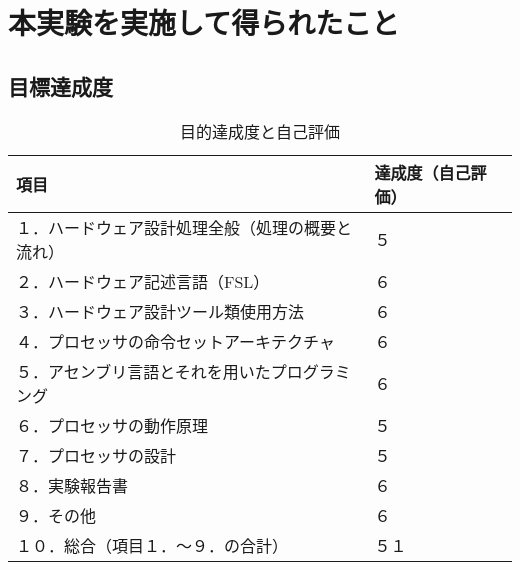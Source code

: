 \documentclass{jarticle}[11pt]
\begin{document}
  \section{本実験を実施して得られたこと}\label{sec:本実験を実施して得られたこと}

  \subsection{目標達成度}

    \begin{table*}[h]
      \caption{目的達成度と自己評価}
      \label{目的達成度と自己評価}
      \begin{center}
        \begin{tabular}{l|l}
          \hline \hline
          項目 &
          達成度（自己評価）
          \\ \hline

          １．ハードウェア設計処理全般（処理の概要と流れ）&
          ５
          \\ 
  
          ２．ハードウェア記述言語（FSL）&
          ６
          \\
          
          ３．ハードウェア設計ツール類使用方法&
          ６
          \\

          ４．プロセッサの命令セットアーキテクチャ&
          ６
          \\

          ５．アセンブリ言語とそれを用いたプログラミング&
          ６
          \\

          ６．プロセッサの動作原理&
          ５
          \\

          ７．プロセッサの設計&
          ５
          \\

          ８．実験報告書&
          ６
          \\

          ９．その他&
          ６
          \\
          \hline

          １０．総合（項目１．～９．の合計）&
          ５１
          \\
          \hline

        \end{tabular}
      \end{center}
    \end{table*}
\end{document}
